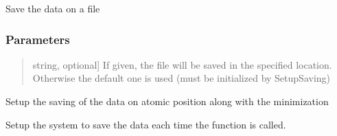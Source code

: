 \documentclass[a4paper,11pt,english]{sphinxmanual}
\begin{document}
\begin{fulllineitems}
\begin{fulllineitems}
\end{fulllineitems}


\begin{fulllineitems}
\label{\detokenize{apireference:sscha.Utilities.IOInfo.Save}}
\pysigstartsignatures
{}
\pysigstopsignatures
\sphinxAtStartPar
Save the data on a file


\subsubsection{Parameters}
\label{\detokenize{apireference:id44}}\begin{quote}
\begin{description}
\sphinxlineitem{fname}{[}string, optional{]}
\sphinxAtStartPar
If given, the file will be saved in the specified location.
Otherwise the default one is used (must be initialized by SetupSaving)

\end{description}
\end{quote}

\end{fulllineitems}


\begin{fulllineitems}
\label{\detokenize{apireference:sscha.Utilities.IOInfo.SetupAtomicPositions}}
\pysigstartsignatures
{}
\pysigstopsignatures
\sphinxAtStartPar
Setup the saving of the data on atomic position along with the minimization

\end{fulllineitems}


\begin{fulllineitems}
\label{\detokenize{apireference:sscha.Utilities.IOInfo.SetupSaving}}
\pysigstartsignatures
{}
\pysigstopsignatures
\sphinxAtStartPar
Setup the system to save the data each time the function is called.


\end{fulllineitems}
\end{fulllineitems}
\end{document}
